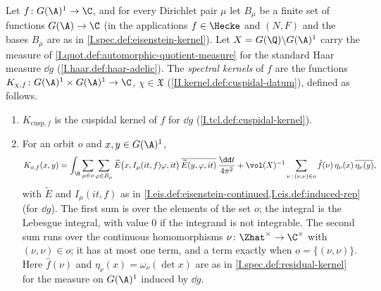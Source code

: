 Let $f\colon G(\A)^1\to\C$, and for every Dirichlet pair $\mu$ let $B_\mu$ be a finite set of functions $G(\A)\to\C$ (in the applications $f\in\Hecke$ and
$(N,F)$ and the bases $B_\mu$ are as in \cref{I.spec.def:eisenstein-kernel}). Let $X=G(\Q)\backslash G(\A)^1$ carry the measure of
\cref{I.quot.def:automorphic-quotient-measure} for the standard Haar measure $\dd g$ (\cref{I.haar.def:haar-adelic}). The \emph{spectral kernels} of $f$
are the functions $K_{\chi,f}\colon G(\A)^1\times G(\A)^1\to\C$, $\chi\in\mathfrak X$ (\cref{II.kernel.def:cuspidal-datum}), defined as follows.
\begin{enumerate}[label=(\roman*)]
\item $K_{\mathrm{cusp},f}$ is the cuspidal kernel of $f$ for $\dd g$ (\cref{I.tcl.def:cuspidal-kernel}).
\item For an orbit $o$ and $x,y\in G(\A)^1$,
\[
  K_{o,f}(x,y)=\int_\R\sum_{\mu\in o}\sum_{\varphi\in B_\mu}\widetilde E\bigl(x,I_\mu(it,f)\varphi,it\bigr)\,\overline{\widetilde E(y,\varphi,it)}\,\frac{\dd t}{4\pi^2}
  +\vol(X)^{-1}\sum_{\nu\,:\,(\nu,\nu)\in o}\hat f(\nu)\,\eta_\nu(x)\,\overline{\eta_\nu(y)} ,
\]
with $\widetilde E$ and $I_\mu(it,f)$ as in \cref{I.eis.def:eisenstein-continued,I.eis.def:induced-rep} (for $\dd g$). The first sum is over the elements of the set $o$;
the integral is the Lebesgue integral, with value $0$ if the integrand is not integrable. The second sum runs over the continuous homomorphisms
$\nu\colon\Zhat^\times\to\C^\times$ with $(\nu,\nu)\in o$; it has at most one term, and a term exactly when $o=\{(\nu,\nu)\}$. Here $\hat f(\nu)$ and
$\eta_\nu(x)=\omega_\nu(\det x)$ are as in \cref{I.spec.def:residual-kernel} for the measure on $G(\A)^1$ induced by $\dd g$.
\end{enumerate}
